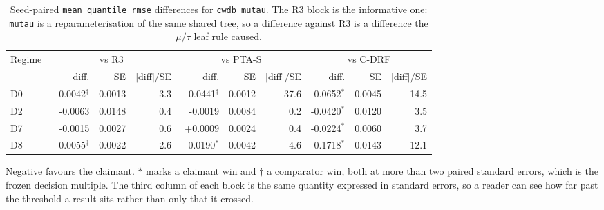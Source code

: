 \begin{table}[htbp]
\centering
\caption{Seed-paired \texttt{mean\_quantile\_rmse} differences for \texttt{cwdb\_mutau}. The R3 block is the informative one: \texttt{mutau} is a reparameterisation of the same shared tree, so a difference against R3 is a difference the $\mu/\tau$ leaf rule caused.}
\label{tab:p55-paired-mutau}
\scriptsize
\setlength{\tabcolsep}{4pt}
\begin{tabular}{@{}lrrrrrrrrr@{}}
\toprule
Regime & \multicolumn{3}{c}{vs R3} & \multicolumn{3}{c}{vs PTA-S} & \multicolumn{3}{c}{vs C-DRF} \\
  & diff. & SE & $|$diff$|/$SE & diff. & SE & $|$diff$|/$SE & diff. & SE & $|$diff$|/$SE \\
\midrule
D0 & +0.0042$^{\dagger}$ & 0.0013 & 3.3 & +0.0441$^{\dagger}$ & 0.0012 & 37.6 & -0.0652$^{\ast}$ & 0.0045 & 14.5 \\
D2 & -0.0063 & 0.0148 & 0.4 & -0.0019 & 0.0084 & 0.2 & -0.0420$^{\ast}$ & 0.0120 & 3.5 \\
D7 & -0.0015 & 0.0027 & 0.6 & +0.0009 & 0.0024 & 0.4 & -0.0224$^{\ast}$ & 0.0060 & 3.7 \\
D8 & +0.0055$^{\dagger}$ & 0.0022 & 2.6 & -0.0190$^{\ast}$ & 0.0042 & 4.6 & -0.1718$^{\ast}$ & 0.0143 & 12.1 \\
\bottomrule
\end{tabular}
\par\vspace{2pt}\parbox{0.96\textwidth}{\scriptsize Negative favours the claimant. $\ast$ marks a claimant win and $\dagger$ a comparator win, both at more than two paired standard errors, which is the frozen decision multiple. The third column of each block is the same quantity expressed in standard errors, so a reader can see how far past the threshold a result sits rather than only that it crossed.}
\end{table}

